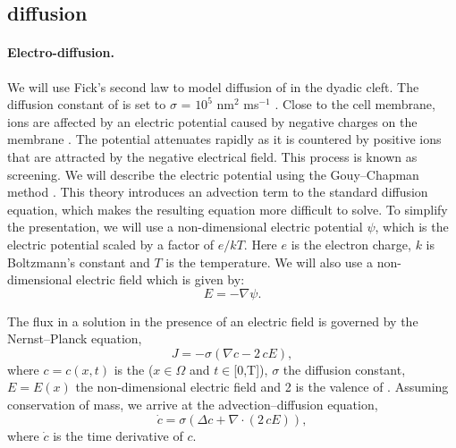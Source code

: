 \subsection{\Ca diffusion}
\label{sec:hake:ca-diffusion}

\paragraph{Electro-diffusion.}
  
  

We will use Fick's second law to model diffusion of \Ca in the dyadic
cleft. The diffusion constant of \Ca is set to $\sigma$ = $10^5$
nm$^2$ ms$^{-1}$ \citep{LangerPeskoff1996}. Close to the cell membrane,
ions are affected by an electric potential caused by negative charges
on the membrane
\citep{McLaughlinSzaboEisenman1971,LangnerCafisoMarceljaEtAl1990}. The
potential attenuates rapidly as it is countered by positive ions that
are attracted by the negative electrical field. This process is known
as screening. We will describe the electric potential using the
Gouy--Chapman method \citep{Grahame1947}. This theory introduces an
advection term to the standard diffusion equation, which makes the
resulting equation more difficult to solve. To simplify the
presentation, we will use a non-dimensional electric potential $\psi$,
which is the electric potential scaled by a factor of $e/kT$. Here $e$
is the electron charge, $k$ is Boltzmann's constant and $T$ is the
temperature. We will also use a non-dimensional electric field which
is given by:
\begin{equation}
  \label{eq:hake:electric_field}
  E=-\nabla\psi.
\end{equation}

The \Ca flux in a solution in the presence of an electric field is
governed by the Nernst--Planck equation,
\begin{equation}
  \label{eq:hake:nernst-planck}
  J = -\sigma\left(\nabla c-2\,cE\right),
\end{equation}
where $c = c(x,t)$ is the \CaC ($x\in\Omega$ and $t\in$[0,T]),
$\sigma$ the diffusion constant, $E = E(x)$ the non-dimensional
electric field and 2 is the valence of \Ca. Assuming conservation of
mass, we arrive at the advection--diffusion equation,
\begin{equation}
  \label{eq:hake:advection-diffusion}
  \dot{c}=\sigma\left(\Delta c + \nabla\cdot\left(2\,cE\right)\right),
\end{equation}
where $\dot{c}$ is the time derivative of $c$.

